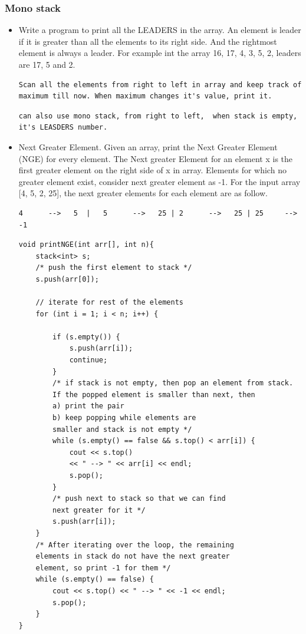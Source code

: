 \documentclass[a4paper,11pt,twoside]{book}
\begin{document}
\subsubsection{Mono stack}
\begin{itemize}
	
	\item  Write a program to print all the LEADERS in the array. An element is leader if it is greater than all the elements to its right side. And the rightmost element is always a leader. For example int the array {16, 17, 4, 3, 5, 2}, leaders are 17, 5 and 2.  
	
\begin{lstlisting}[breaklines]
Scan all the elements from right to left in array and keep track of maximum till now. When maximum changes it's value, print it.
\end{lstlisting}	

\begin{lstlisting}[breaklines]
can also use mono stack, from right to left,  when stack is empty, it's LEASDERS number. 
\end{lstlisting}	

	
	\item Next Greater Element.  Given an array, print the Next Greater Element (NGE) for every element. The Next greater Element for an element x is the first greater element on the right side of x in array. Elements for which no greater element exist, consider next greater element as -1. For the input array [4, 5, 2, 25], the next greater elements for
	each element are as follow.
\begin{verbatim}
4      -->   5  |  	5      -->   25 | 2      -->   25 | 25     -->   -1
\end{verbatim}

\begin{lstlisting}[breaklines]
void printNGE(int arr[], int n){
	stack<int> s;	
	/* push the first element to stack */
	s.push(arr[0]);

	// iterate for rest of the elements
	for (int i = 1; i < n; i++) {
		
		if (s.empty()) {
			s.push(arr[i]);
			continue;
		}		
		/* if stack is not empty, then pop an element from stack.
		If the popped element is smaller than next, then
		a) print the pair
		b) keep popping while elements are
		smaller and stack is not empty */
		while (s.empty() == false && s.top() < arr[i]) {
			cout << s.top() 
			<< " --> " << arr[i] << endl;
			s.pop();
		}	
		/* push next to stack so that we can find
		next greater for it */
		s.push(arr[i]);
	}	
	/* After iterating over the loop, the remaining
	elements in stack do not have the next greater
	element, so print -1 for them */
	while (s.empty() == false) {
		cout << s.top() << " --> " << -1 << endl;
		s.pop();
	}
}
\end{lstlisting}	


\end{itemize}
\end{document}
